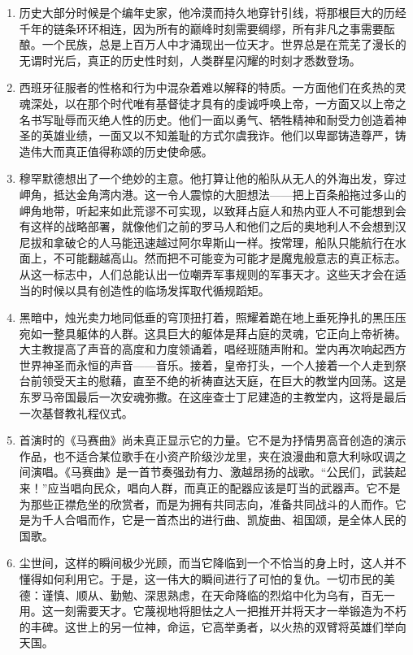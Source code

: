 \documentclass[UTF8]{ctexart}
\begin{document}
		\begin{enumerate}
			
			\item 历史大部分时候是个编年史家，他冷漠而持久地穿针引线，将那根巨大的历经千年的链条环环相连，因为所有的巅峰时刻需要绸缪，所有非凡之事需要酝酿。一个民族，总是上百万人中才涌现出一位天才。世界总是在荒芜了漫长的无谓时光后，真正的历史性时刻，人类群星闪耀的时刻才悉数登场。
			
			\item 西班牙征服者的性格和行为中混杂着难以解释的特质。一方面他们在炙热的灵魂深处，以在那个时代唯有基督徒才具有的虔诚呼唤上帝，一方面又以上帝之名书写耻辱而灭绝人性的历史。他们一面以勇气、牺牲精神和耐受力创造着神圣的英雄业绩，一面又以不知羞耻的方式尔虞我诈。他们以卑鄙铸造尊严，铸造伟大而真正值得称颂的历史使命感。
			
			\item 穆罕默德想出了一个绝妙的主意。他打算让他的船队从无人的外海出发，穿过岬角，抵达金角湾内港。这一令人震惊的大胆想法——把上百条船拖过多山的岬角地带，听起来如此荒谬不可实现，以致拜占庭人和热内亚人不可能想到会有这样的战略部署，就像他们之前的罗马人和他们之后的奥地利人不会想到汉尼拔和拿破仑的人马能迅速越过阿尔卑斯山一样。按常理，船队只能航行在水面上，不可能翻越高山。然而把不可能变为可能才是魔鬼般意志的真正标志。从这一标志中，人们总能认出一位嘲弄军事规则的军事天才。这些天才会在适当的时候以具有创造性的临场发挥取代循规蹈矩。
			
			\item 黑暗中，烛光卖力地同低垂的穹顶扭打着，照耀着跪在地上垂死挣扎的黑压压宛如一整具躯体的人群。这具巨大的躯体是拜占庭的灵魂，它正向上帝祈祷。大主教提高了声音的高度和力度领诵着，唱经班随声附和。堂内再次响起西方世界神圣而永恒的声音——音乐。接着，皇帝打头，一个人接着一个人走到祭台前领受天主的慰藉，直至不绝的祈祷直达天庭，在巨大的教堂内回荡。这是东罗马帝国最后一次安魂弥撒。在这座查士丁尼建造的主教堂内，这将是最后一次基督教礼程仪式。
			
			\item 首演时的《马赛曲》尚未真正显示它的力量。它不是为抒情男高音创造的演示作品，也不适合某位歌手在小资产阶级沙龙里，夹在浪漫曲和意大利咏叹调之间演唱。《马赛曲》是一首节奏强劲有力、激越昂扬的战歌。“公民们，武装起来！”应当唱向民众，唱向人群，而真正的配器应该是叮当的武器声。它不是为那些正襟危坐的欣赏者，而是为拥有共同志向，准备共同战斗的人而作。它是为千人合唱而作，它是一首杰出的进行曲、凯旋曲、祖国颂，是全体人民的国歌。
			
			\item 尘世间，这样的瞬间极少光顾，而当它降临到一个不恰当的身上时，这人并不懂得如何利用它。于是，这一伟大的瞬间进行了可怕的复仇。一切市民的美德：谨慎、顺从、勤勉、深思熟虑，在天命降临的烈焰中化为乌有，百无一用。这一刻需要天才。它蔑视地将胆怯之人一把推开并将天才一举锻造为不朽的丰碑。这世上的另一位神，命运，它高举勇者，以火热的双臂将英雄们举向天国。
			

\end{enumerate}
\end{document}
